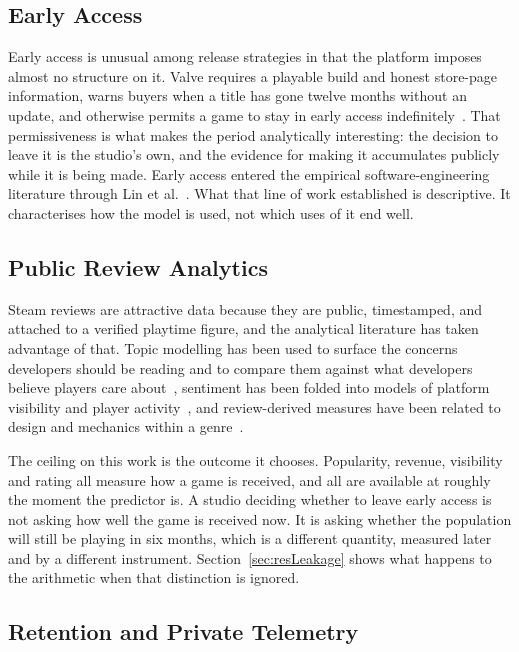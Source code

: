 \documentclass[sigconf]{acmart}
\begin{document}
\subsection{Early Access}

Early access is unusual among release strategies in that the platform imposes almost no structure
on it. Valve requires a playable build and honest store-page information, warns buyers when a title
has gone twelve months without an update, and otherwise permits a game to stay in early access
indefinitely~\cite{ValveEarlyAccess}. That permissiveness is what makes the period analytically
interesting: the decision to leave it is the studio's own, and the evidence for making it
accumulates publicly while it is being made. Early access entered the empirical
software-engineering literature through Lin et al.~\cite{LinBezemerHassan2018}. What that line of
work established is descriptive. It characterises how the model is used, not which uses of it end
well.

\subsection{Public Review Analytics}

Steam reviews are attractive data because they are public, timestamped, and attached to a verified
playtime figure, and the analytical literature has taken advantage of that. Topic modelling has
been used to surface the concerns developers should be reading and to compare them against what
developers believe players care about~\cite{TongWillcockSun2025}, sentiment has been folded into
models of platform visibility and player activity~\cite{Sun2026}, and review-derived measures have
been related to design and mechanics within a genre~\cite{Guzsvinecz2022}.

The ceiling on this work is the outcome it chooses. Popularity, revenue, visibility and rating all
measure how a game is received, and all are available at roughly the moment the predictor is. A
studio deciding whether to leave early access is not asking how well the game is received now. It
is asking whether the population will still be playing in six months, which is a different
quantity, measured later and by a different instrument. Section~\ref{sec:resLeakage} shows what
happens to the arithmetic when that distinction is ignored.

\subsection{Retention and Private Telemetry}
\end{document}
